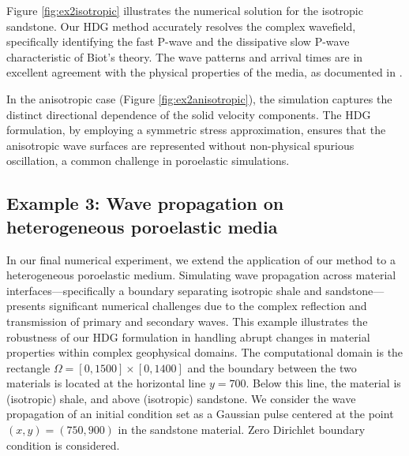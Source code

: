 \documentclass[10pt,letterpaper]{amsart}
\theoremstyle{plain} %
\theoremstyle{remark} %
\begin{document}
{
Figure \ref{fig:ex2isotropic} illustrates the numerical solution for the isotropic sandstone. Our HDG method accurately resolves the complex wavefield, specifically identifying the fast P-wave and the dissipative slow P-wave characteristic of Biot's theory. The wave patterns and arrival times are in excellent agreement with the physical properties of the media, as documented in \cite{Alkhimenkov:2021}.}

{In the anisotropic case (Figure \ref{fig:ex2anisotropic}), the simulation captures the distinct directional dependence of the solid velocity components. The HDG formulation, by employing a symmetric stress approximation, ensures that the anisotropic wave surfaces are represented without non-physical spurious oscillation, a common challenge in poroelastic simulations.}

\subsection*{Example 3: Wave propagation on heterogeneous poroelastic media }
{In our final numerical experiment, we extend the application of our method to a heterogeneous poroelastic medium. Simulating wave propagation across material interfaces---specifically a boundary separating isotropic shale and sandstone---presents significant numerical challenges due to the complex reflection and transmission of primary and secondary waves. This example illustrates the robustness of our HDG formulation in handling abrupt changes in material properties within complex geophysical domains.} The computational domain is the rectangle $\Omega= [0,1500]\times [0,1400]$ and the boundary between the two materials is located at the horizontal line $y=700$. Below this line, the material is (isotropic) shale, and above (isotropic) sandstone. We consider the wave propagation of an initial condition set as a Gaussian pulse centered at the point $(x,y) = (750,900)$ in the sandstone material. Zero Dirichlet boundary condition is considered. 

\end{document}
